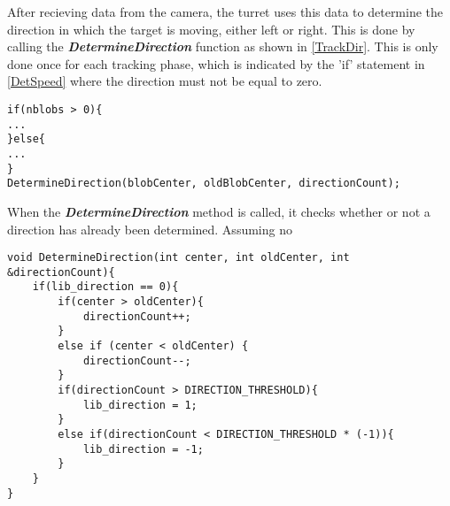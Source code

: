 After recieving data from the camera, the turret uses this data to determine the
direction in which the target is moving, either left or right. This is done by
calling the \textbf{\textit{DetermineDirection}} function as shown in
\autoref{TrackDir}. This is only done once for each tracking phase, which is
indicated by the 'if' statement in \autoref{DetSpeed} where the direction
must not be equal to zero.

\begin{minipage}[H]{\linewidth}
\begin{lstlisting}[caption = Call DetermineDirection., label = TrackDir]
if(nblobs > 0){
...
}else{
...
}
DetermineDirection(blobCenter, oldBlobCenter, directionCount);
\end{lstlisting}
\end{minipage}

When the \textbf{\textit{DetermineDirection}} method is called, it checks
whether or not a direction has already been determined. Assuming no 

\begin{minipage}[H]{\linewidth}
\begin{lstlisting}[caption = Determine the targets direction., label = DeterDir]
void DetermineDirection(int center, int oldCenter, int &directionCount){
	if(lib_direction == 0){
		if(center > oldCenter){
    		directionCount++;
		}
    	else if (center < oldCenter) {
    		directionCount--;
   		}
    	if(directionCount > DIRECTION_THRESHOLD){
    		lib_direction = 1;
    	}
    	else if(directionCount < DIRECTION_THRESHOLD * (-1)){
    		lib_direction = -1;
    	}
    }
}
\end{lstlisting}
\end{minipage}


